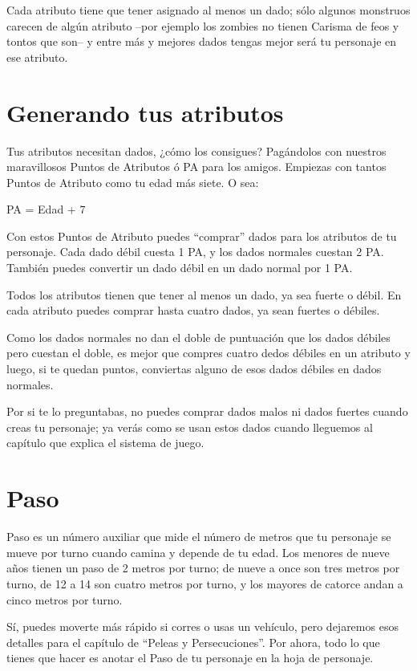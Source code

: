 Cada atributo tiene que tener asignado al menos un dado; sólo algunos monstruos carecen de algún atributo --por ejemplo los zombies no tienen Carisma de feos y tontos que son-- y entre más y mejores dados tengas mejor será tu personaje en ese atributo.

\section{Generando tus atributos}

Tus atributos necesitan dados, ¿cómo los consigues? Pagándolos con nuestros maravillosos Puntos de Atributos ó PA para los amigos. Empiezas con tantos Puntos de Atributo como tu edad más siete. O sea:

PA = Edad + 7

Con estos Puntos de Atributo puedes “comprar” dados para los atributos de tu personaje. Cada dado débil cuesta 1 PA, y los dados normales cuestan 2 PA. También puedes convertir un dado débil en un dado normal por 1 PA.

Todos los atributos tienen que tener al menos un dado, ya sea fuerte o débil. En cada atributo puedes comprar hasta cuatro dados, ya sean fuertes o débiles.

Como los dados normales no dan el doble de puntuación que los dados débiles pero cuestan el doble, es mejor que compres cuatro dedos débiles en un atributo y luego, si te quedan puntos, conviertas alguno de esos dados débiles en dados normales.

Por si te lo preguntabas, no puedes comprar dados malos ni dados fuertes cuando creas tu personaje; ya verás como se usan estos dados cuando lleguemos al capítulo que explica el sistema de juego.

\section{Paso}

Paso es un número auxiliar que mide el número de metros que tu personaje se mueve por turno cuando camina y depende de tu edad. Los menores de nueve años tienen un paso de 2 metros por turno; de nueve a once son tres metros por turno, de 12 a 14 son cuatro metros por turno, y los mayores de catorce andan a cinco metros por turno.

Sí, puedes moverte más rápido si corres o usas un vehículo, pero dejaremos esos detalles para el capítulo de “Peleas y Persecuciones”. Por ahora, todo lo que tienes que hacer es anotar el Paso de tu personaje en la hoja de personaje.

